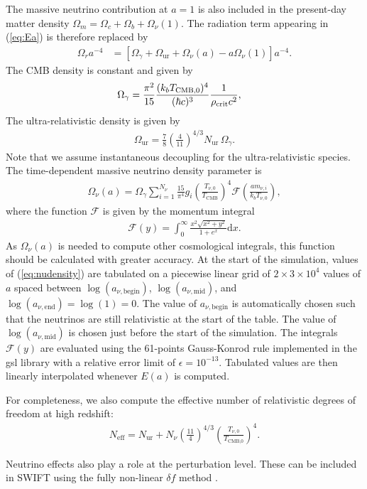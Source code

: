 The massive neutrino contribution at $a=1$ is also included in the present-day matter density $\Omega_m=\Omega_c+\Omega_b+\Omega_{\nu}(1)$. The radiation term appearing in (\ref{eq:Ea}) is therefore replaced by
\begin{align}
    \Omega_r a^{-4} &= \left[\Omega_\gamma + \Omega_\mathrm{ur} + \Omega_\nu(a) - a\Omega_{\nu}(1)\right] a^{-4}.
\end{align}
The CMB density is constant and given by
%
\begin{align}
    \Omega_\gamma &= \frac{\pi^2}{15}\frac{(k_b T_\text{CMB,0})^4}{(\hbar c)^3}\frac{1}{\rho_{\rm crit}c^2},
\end{align}
The ultra-relativistic density is given by
\begin{align}
    \Omega_\mathrm{ur} = \frac{7}{8}\left(\frac{4}{11}\right)^{4/3} N_\mathrm{ur}\,\Omega_\gamma.
\end{align}
Note that we assume instantaneous decoupling for the ultra-relativistic species. The time-dependent massive neutrino density parameter is \citep{Zennaro2016}
\begin{align}
    \Omega_\nu(a) = \Omega_\gamma \sum_{i=1}^{N_\nu}\frac{15}{\pi^4}g_i\left(\frac{T_{\nu,0}}{T_\text{CMB}}\right)^4 \mathcal{F}\left(\frac{a m_{\nu,i}}{k_b T_{\nu,0}}\right), \label{eq:nudensity}
\end{align}
where the function $\mathcal{F}$ is given by the momentum integral
%
\begin{align}
    \mathcal{F}(y) = \int_0^{\infty} \frac{x^2\sqrt{x^2+y^2}}{1+e^{x}}\mathrm{d}x.
\end{align}
As $\Omega_\nu(a)$ is needed to compute other cosmological integrals, this function should be calculated with greater accuracy. At the start of the simulation, values of (\ref{eq:nudensity}) are tabulated on a piecewise linear grid of $2\times3\times10^4$ values of $a$ spaced between $\log(a_{\nu,\text{begin}})$, $\log(a_{\nu,\text{mid}})$, and $\log(a_{\nu,\text{end}}) = \log(1)=0$. The value of $a_{\nu,\text{begin}}$ is automatically chosen such that the neutrinos are still relativistic at the start of the table. The value of $\log(a_{\nu,\text{mid}})$ is chosen just before the start of the simulation. The integrals $\mathcal{F}(y)$ are evaluated using the 61-points Gauss-Konrod rule implemented in the {\sc gsl} library with a relative error limit of $\epsilon=10^{-13}$. Tabulated values are then linearly interpolated whenever $E(a)$ is computed.

For completeness, we also compute the effective number of relativistic degrees of freedom at high redshift:
\begin{align}
    N_\text{eff} = N_\mathrm{ur} + N_\nu\left(\frac{11}{4}\right)^{4/3}\left(\frac{T_{\nu,0}}{T_\text{CMB,0}}\right)^4.
\end{align}

Neutrino effects also play a role at the perturbation level. These can be included in SWIFT using the fully non-linear $\delta f$ method \citep{Elbers2020}.
